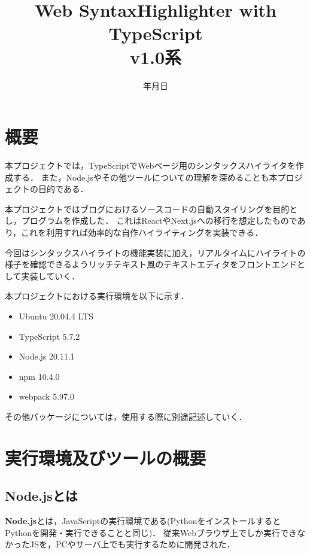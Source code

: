 \documentclass[autodetect-engine,dvi=dvipdfmx,ja=standard,
               a4j,11pt]{bxjsarticle}
\title{Web SyntaxHighlighter with TypeScript \\
       v1.0系}
\date{\number\year 年\number\month 月\number\day 日}
\begin{document}
\maketitle

\section{概要}

本プロジェクトでは，TypeScriptでWebページ用のシンタックスハイライタを作成する．
また，Node.jsやその他ツールについての理解を深めることも本プロジェクトの目的である．

本プロジェクトではブログにおけるソースコードの自動スタイリングを目的とし，プログラムを作成した．
これはReactやNext.jsへの移行を想定したものであり，これを利用すれば効率的な自作ハイライティングを実装できる．

今回はシンタックスハイライトの機能実装に加え，リアルタイムにハイライトの様子を確認できるようリッチテキスト風のテキストエディタをフロントエンドとして実装していく．

本プロジェクトにおける実行環境を以下に示す．

\begin{itemize}
  \item Ubuntu 20.04.4 LTS
  \item TypeScript 5.7.2
  \item Node.js 20.11.1
  \item npm 10.4.0
  \item webpack 5.97.0
\end{itemize}
%
その他パッケージについては，使用する際に別途記述していく．

\section{実行環境及びツールの概要}

\subsection{Node.jsとは}

{\bf Node.js}とは，JavaScriptの実行環境である(PythonをインストールするとPythonを開発・実行できることと同じ)．
従来Webブラウザ上でしか実行できなかったJSを，PCやサーバ上でも実行するために開発された．
\end{document}
